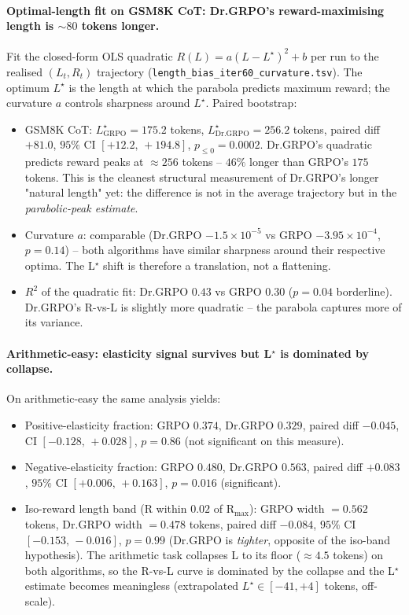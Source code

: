 \documentclass{article}
\begin{document}
\paragraph{Optimal-length fit on GSM8K CoT: Dr.GRPO's reward-maximising
length is $\sim 80$ tokens longer.}
Fit the closed-form OLS quadratic
$R(L) = a (L - L^\star)^2 + b$ per run to the realised $(L_t, R_t)$
trajectory (\texttt{length\_bias\_iter60\_curvature.tsv}). The optimum
$L^\star$ is the length at which the parabola predicts maximum reward;
the curvature $a$ controls sharpness around $L^\star$. Paired bootstrap:
\begin{itemize}
\item GSM8K CoT:
      $L^\star_{\text{GRPO}} = 175.2$ tokens,
      $L^\star_{\text{Dr.GRPO}} = 256.2$ tokens,
      paired diff $+81.0$, $95\%$ CI $[+12.2,\, +194.8]$,
      $p_{\le 0} = 0.0002$. Dr.GRPO's quadratic predicts reward peaks
      at $\approx 256$ tokens -- $46\%$ longer than GRPO's
      $175$ tokens. This is the cleanest structural measurement of
      Dr.GRPO's longer "natural length" yet: the difference is not in
      the average trajectory but in the \emph{parabolic-peak estimate}.
\item Curvature $a$: comparable (Dr.GRPO $-1.5 \times 10^{-5}$ vs
      GRPO $-3.95 \times 10^{-4}$, $p = 0.14$) -- both algorithms have
      similar sharpness around their respective optima. The L$^\star$
      shift is therefore a translation, not a flattening.
\item $R^2$ of the quadratic fit: Dr.GRPO $0.43$ vs GRPO $0.30$
      ($p = 0.04$ borderline). Dr.GRPO's R-vs-L is slightly more
      quadratic -- the parabola captures more of its variance.
\end{itemize}

\paragraph{Arithmetic-easy: elasticity signal survives but L$^\star$ is
dominated by collapse.}
On arithmetic-easy the same analysis yields:
\begin{itemize}
\item Positive-elasticity fraction: GRPO $0.374$, Dr.GRPO $0.329$, paired
      diff $-0.045$, CI $[-0.128,\, +0.028]$, $p = 0.86$ (not
      significant on this measure).
\item Negative-elasticity fraction: GRPO $0.480$, Dr.GRPO $0.563$, paired
      diff $+0.083$, $95\%$ CI $[+0.006,\, +0.163]$, $p = 0.016$
      (significant).
\item Iso-reward length band (R within $0.02$ of R$_\text{max}$): GRPO
      width $= 0.562$ tokens, Dr.GRPO width $= 0.478$ tokens, paired
      diff $-0.084$, $95\%$ CI $[-0.153,\, -0.016]$, $p = 0.99$
      (Dr.GRPO is \emph{tighter}, opposite of the iso-band hypothesis).
      The arithmetic task collapses L to its floor ($\approx 4.5$
      tokens) on both algorithms, so the R-vs-L curve is dominated by
      the collapse and the L$^\star$ estimate becomes meaningless
      (extrapolated $L^\star \in [-41, +4]$ tokens, off-scale).
\end{itemize}
\end{document}
